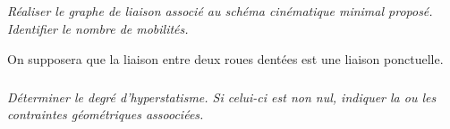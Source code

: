 \documentclass[10pt,fleqn]{article} %
\begin{document}
\begin{multicols}{2}
\subparagraph{}
\textit{Réaliser le graphe de liaison associé au schéma cinématique minimal proposé. Identifier le nombre de mobilités. }
\ifprof
\begin{corrige}
\end{corrige}\else\fi

On supposera que la liaison entre deux roues dentées est une liaison ponctuelle. 


\subparagraph{}
\textit{Déterminer le degré d'hyperstatisme. Si celui-ci est non nul, indiquer la ou les contraintes géométriques assoociées. }
\ifprof
\begin{corrige}
\end{corrige}\else\fi


\end{multicols}
\end{document}
